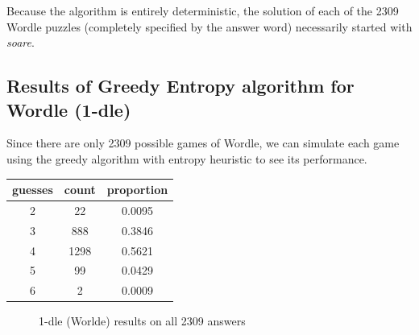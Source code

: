 \documentclass[11pt, oneside]{article} 	%
\begin{document}
Because the algorithm is entirely deterministic, the solution of each of the 2309 Wordle puzzles (completely specified by the answer word) necessarily started with \emph{soare}.

\subsection{Results of Greedy Entropy algorithm for Wordle (1-dle)}

Since there are only 2309 possible games of Wordle, we can simulate each game using the greedy algorithm with entropy heuristic to see its performance.

\begin{center}
\begin{tabular}{ |c|c|c| }
 \hline
guesses & count & proportion \\
 \hline
2 & 22 & 0.0095 \\
3 & 888 & 0.3846 \\
4 & 1298 & 0.5621 \\
5 & 99 & 0.0429 \\
6 & 2 & 0.0009 \\
 \hline
\end{tabular}
\end{center}

\begin{figure}%
 \centering
 \qquad
 \caption{1-dle (Worlde) results on all 2309 answers}%
\end{figure}
\end{document}
